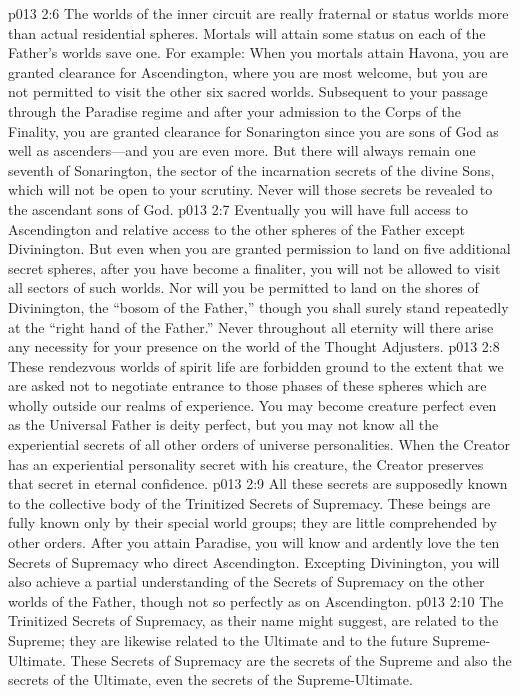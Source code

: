 \pc \vs p013 2:6 The worlds of the inner circuit are really fraternal or status worlds more than actual residential spheres. Mortals will attain some status on each of the Father’s worlds save one. For example: When you mortals attain Havona, you are granted clearance for Ascendington, where you are most welcome, but you are not permitted to visit the other six sacred worlds. Subsequent to your passage through the Paradise regime and after your admission to the Corps of the Finality, you are granted clearance for Sonarington since you are sons of God as well as ascenders---and you are even more. But there will always remain one seventh of Sonarington, the sector of the incarnation secrets of the divine Sons, which will not be open to your scrutiny. Never will those secrets be revealed to the ascendant sons of God.
\vs p013 2:7 Eventually you will have full access to Ascendington and relative access to the other spheres of the Father except Divinington. But even when you are granted permission to land on five additional secret spheres, after you have become a finaliter, you will not be allowed to visit all sectors of such worlds. Nor will you be permitted to land on the shores of Divinington, the “bosom of the Father,” though you shall surely stand repeatedly at the “right hand of the Father.” Never throughout all eternity will there arise any necessity for your presence on the world of the Thought Adjusters.
\vs p013 2:8 These rendezvous worlds of spirit life are forbidden ground to the extent that we are asked not to negotiate entrance to those phases of these spheres which are wholly outside our realms of experience. You may become creature perfect even as the Universal Father is deity perfect, but you may not know all the experiential secrets of all other orders of universe personalities. When the Creator has an experiential personality secret with his creature, the Creator preserves that secret in eternal confidence.
\pc \vs p013 2:9 All these secrets are supposedly known to the collective body of the Trinitized Secrets of Supremacy. These beings are fully known only by their special world groups; they are little comprehended by other orders. After you attain Paradise, you will know and ardently love the ten Secrets of Supremacy who direct Ascendington. Excepting Divinington, you will also achieve a partial understanding of the Secrets of Supremacy on the other worlds of the Father, though not so perfectly as on Ascendington.
\vs p013 2:10 The Trinitized Secrets of Supremacy, as their name might suggest, are related to the Supreme; they are likewise related to the Ultimate and to the future Supreme\hyp{}Ultimate. These Secrets of Supremacy are the secrets of the Supreme and also the secrets of the Ultimate, even the secrets of the Supreme\hyp{}Ultimate.

